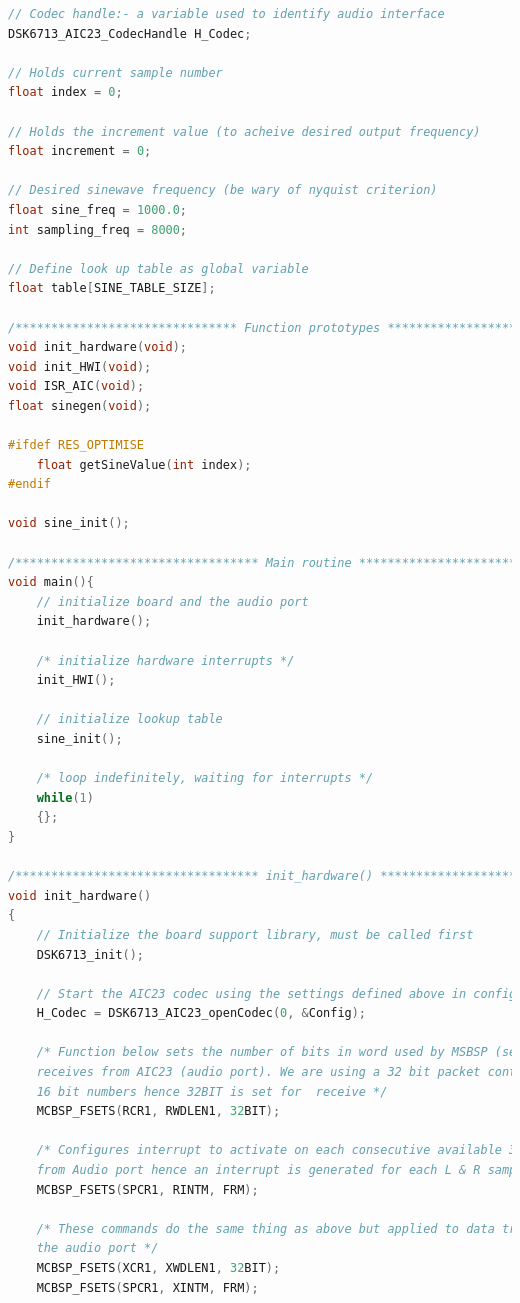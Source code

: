 \documentclass{article}
\begin{document}
\begin{lstlisting}[language=C, caption=C-code to generate interrupt driven rectified sine wave (using a look-up table), label = lst:init_hardware]
// Codec handle:- a variable used to identify audio interface  
DSK6713_AIC23_CodecHandle H_Codec;

// Holds current sample number
float index = 0;

// Holds the increment value (to acheive desired output frequency)
float increment = 0;

// Desired sinewave frequency (be wary of nyquist criterion)
float sine_freq = 1000.0; 
int sampling_freq = 8000;

// Define look up table as global variable
float table[SINE_TABLE_SIZE];

/******************************* Function prototypes ********************************/
void init_hardware(void);     
void init_HWI(void);   
void ISR_AIC(void);     
float sinegen(void);

#ifdef RES_OPTIMISE
	float getSineValue(int index);
#endif

void sine_init();

/********************************** Main routine ************************************/
void main(){      
    // initialize board and the audio port
    init_hardware();
    
    /* initialize hardware interrupts */
    init_HWI();
    
    // initialize lookup table
    sine_init();
       
    /* loop indefinitely, waiting for interrupts */  					
    while(1) 
    {};
}
        
/********************************** init_hardware() **********************************/  
void init_hardware()
{
    // Initialize the board support library, must be called first 
    DSK6713_init();
    
    // Start the AIC23 codec using the settings defined above in config 
    H_Codec = DSK6713_AIC23_openCodec(0, &Config);
    
    /* Function below sets the number of bits in word used by MSBSP (serial port) for 
    receives from AIC23 (audio port). We are using a 32 bit packet containing two 
    16 bit numbers hence 32BIT is set for  receive */
    MCBSP_FSETS(RCR1, RWDLEN1, 32BIT);	
    
    /* Configures interrupt to activate on each consecutive available 32 bits 
    from Audio port hence an interrupt is generated for each L & R sample pair */	
    MCBSP_FSETS(SPCR1, RINTM, FRM);
    
    /* These commands do the same thing as above but applied to data transfers to  
    the audio port */
    MCBSP_FSETS(XCR1, XWDLEN1, 32BIT);	
    MCBSP_FSETS(SPCR1, XINTM, FRM);	
	


\end{lstlisting}
\end{document}
